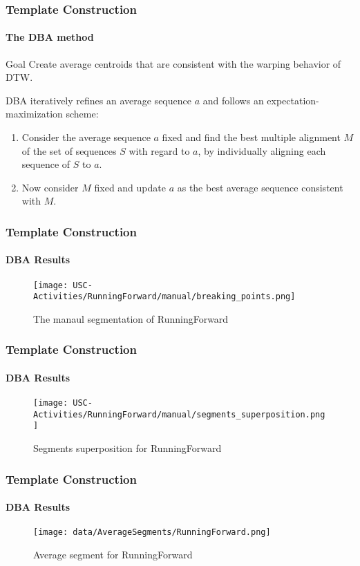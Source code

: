 \documentclass[11pt, sans, handout]{beamer}
\begin{document}
\begin{frame}
	\frametitle{Template Construction}
	\framesubtitle{The DBA method}
	
	\begin{alertblock}{Goal}
		Create average centroids that are consistent with the warping behavior of DTW. 
	\end{alertblock}
	
	DBA iteratively refines an average sequence $a$ and follows an expectation-maximization scheme:
	\begin{enumerate}
		\item Consider the average sequence $a$ fixed and find the best multiple alignment $M$ of the set of sequences $S$ with regard to $a$, by individually aligning each sequence of $S$ to $a$.
		\item Now consider $M$ fixed and update $a$ as the best average sequence consistent with $M$.
	\end{enumerate}
\end{frame}

\begin{frame}
	\frametitle{Template Construction}
	\framesubtitle{DBA Results}
	
	\begin{figure}[H]
		\centering
		\texttt{[image: USC-Activities/RunningForward/manual/breaking\_points.png]}
		\caption{The manaul segmentation of RunningForward}
		\label{bp_RF}
	\end{figure}
	
\end{frame}

\begin{frame}
	\frametitle{Template Construction}
	\framesubtitle{DBA Results}
	
	\begin{figure}[H]
		\centering
		\texttt{[image: USC-Activities/RunningForward/manual/segments\_superposition.png]}
		\caption{Segments superposition for RunningForward}
		\label{seg_sup_RF}
	\end{figure}
   
\end{frame}

\begin{frame}
	\frametitle{Template Construction}
	\framesubtitle{DBA Results}
	
	\begin{figure}[H]
		\centering
		\texttt{[image: data/AverageSegments/RunningForward.png]}
		\caption{Average segment for RunningForward}
		\label{av_seg_RF}
	\end{figure}
   
\end{frame}
\end{document}
